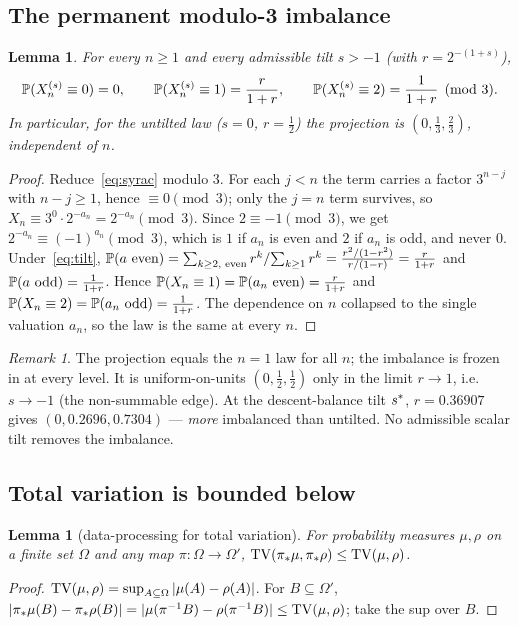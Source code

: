 \documentclass[11pt]{amsart}
\newtheorem{lemma}[theorem]{Lemma}
\theoremstyle{definition}
\theoremstyle{remark}
\newtheorem{remark}[theorem]{Remark}
\begin{document}
\subsection{The permanent modulo-3 imbalance}
\begin{lemma}\label{lem:mod3}
For every $n\ge1$ and every admissible tilt $s>-1$ (with $r=2^{-(1+s)}$),
\[
   \mathbb{P}(X_n^{(s)}\equiv 0)=0,\qquad
   \mathbb{P}(X_n^{(s)}\equiv 1)=\frac{r}{1+r},\qquad
   \mathbb{P}(X_n^{(s)}\equiv 2)=\frac{1}{1+r}\pmod 3 .
\]
In particular, for the untilted law ($s=0$, $r=\tfrac12$) the projection is $(0,\tfrac13,\tfrac23)$,
independent of $n$.
\end{lemma}
\begin{proof}
Reduce~\eqref{eq:syrac} modulo $3$. For each $j<n$ the term carries a factor $3^{n-j}$ with
$n-j\ge1$, hence $\equiv 0\pmod 3$; only the $j=n$ term survives, so
$X_n \equiv 3^0\cdot 2^{-a_n} = 2^{-a_n}\pmod 3$. Since $2\equiv -1\pmod 3$, we get
$2^{-a_n}\equiv(-1)^{a_n}\pmod 3$, which is $1$ if $a_n$ is even and $2$ if $a_n$ is odd, and never $0$.
Under~\eqref{eq:tilt}, $\mathbb{P}(a\text{ even})=\sum_{k\ge2,\text{ even}} r^k/\!\sum_{k\ge1}r^k
=\tfrac{r^2/(1-r^2)}{r/(1-r)}=\tfrac{r}{1+r}$ and $\mathbb{P}(a\text{ odd})=\tfrac{1}{1+r}$. Hence
$\mathbb{P}(X_n\equiv1)=\mathbb{P}(a_n\text{ even})=\tfrac{r}{1+r}$ and $\mathbb{P}(X_n\equiv2)=\mathbb{P}(a_n\text{ odd})=\tfrac{1}{1+r}$.
The dependence on $n$ collapsed to the single valuation $a_n$, so the law is the same at every $n$.
\end{proof}

\begin{remark}
The projection equals the $n=1$ law for all $n$; the imbalance is frozen in at every level. It is
uniform-on-units $(0,\tfrac12,\tfrac12)$ only in the limit $r\to1$, i.e.\ $s\to-1$ (the non-summable
edge). At the descent-balance tilt $s^{*}$, $r=0.36907$ gives $(0,0.2696,0.7304)$ --- \emph{more}
imbalanced than untilted. No admissible scalar tilt removes the imbalance.
\end{remark}

\subsection{Total variation is bounded below}
\begin{lemma}[data-processing for total variation]\label{lem:dpi}
For probability measures $\mu,\rho$ on a finite set $\Omega$ and any map $\pi:\Omega\to\Omega'$,
$\mathrm{TV}(\pi_*\mu,\pi_*\rho)\le\mathrm{TV}(\mu,\rho)$.
\end{lemma}
\begin{proof}
$\mathrm{TV}(\mu,\rho)=\sup_{A\subseteq\Omega}|\mu(A)-\rho(A)|$. For $B\subseteq\Omega'$,
$|\pi_*\mu(B)-\pi_*\rho(B)|=|\mu(\pi^{-1}B)-\rho(\pi^{-1}B)|\le\mathrm{TV}(\mu,\rho)$; take the sup over $B$.
\end{proof}
\end{document}
